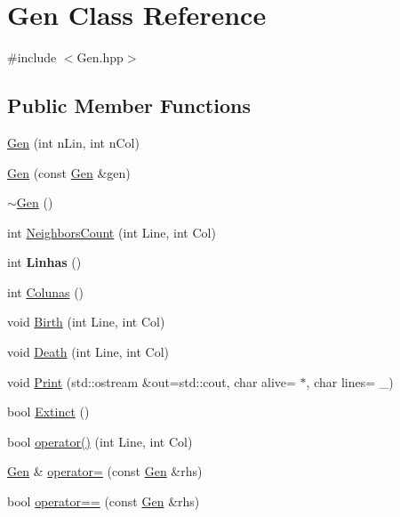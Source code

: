 \hypertarget{classGen}{}\section{Gen Class Reference}
\label{classGen}


{\ttfamily \#include $<$Gen.\+hpp$>$}

\subsection*{Public Member Functions}
\begin{DoxyCompactItemize}
\item 
\hyperlink{classGen_a59a59b301b232cfdb400fbee7f417a98}{Gen} (int n\+Lin, int n\+Col)
\item 
\hyperlink{classGen_abf2b859d90317931cfec92f2333c7b59}{Gen} (const \hyperlink{classGen}{Gen} \&gen)
\item 
\hyperlink{classGen_ad9ebf55c36ea695d174f01cab520f6b6}{$\sim$\+Gen} ()
\item 
int \hyperlink{classGen_a1d31ffd40e5ab9413b37dba53c2820ad}{Neighbors\+Count} (int Line, int Col)
\item 
int {\bfseries Linhas} ()\hypertarget{classGen_a816ff0bc516d8a6d62572fd89a859a5b}{}\label{classGen_a816ff0bc516d8a6d62572fd89a859a5b}

\item 
int \hyperlink{classGen_ae7f419e8143886ceeea18858814da870}{Colunas} ()
\item 
void \hyperlink{classGen_a5c084315ef998945c9184b092220060a}{Birth} (int Line, int Col)
\item 
void \hyperlink{classGen_a9ce722ab5a2bf0225244c228b6fbd06b}{Death} (int Line, int Col)
\item 
void \hyperlink{classGen_a1180f3b0ced66ef44d1a5ef4c78411c4}{Print} (std\+::ostream \&out=std\+::cout, char alive= \textquotesingle{}$\ast$\textquotesingle{}, char lines= \textquotesingle{}\+\_\+\textquotesingle{})
\item 
bool \hyperlink{classGen_ada67a7c88c4004615870be8a8a485a2c}{Extinct} ()
\item 
bool \hyperlink{classGen_aa333b599c71fdfd4051bcfae6d8b631f}{operator()} (int Line, int Col)
\item 
\hyperlink{classGen}{Gen} \& \hyperlink{classGen_ab79577105fe425b7f84f8264c5537670}{operator=} (const \hyperlink{classGen}{Gen} \&rhs)
\item 
bool \hyperlink{classGen_a2ec5cbcb72f8f02024f90dcf85096769}{operator==} (const \hyperlink{classGen}{Gen} \&rhs)
\end{DoxyCompactItemize}


